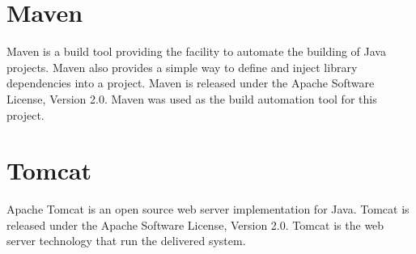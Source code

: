 \section{Maven}
Maven is a build tool providing the facility to automate the building of Java projects. Maven also provides a simple way to define and inject library dependencies into a project. Maven is released under the Apache Software License, Version 2.0. Maven was used as the build automation tool for this project.
\section{Tomcat}
Apache Tomcat is an open source web server implementation for Java. Tomcat is released under the Apache Software License, Version 2.0. Tomcat is the web server technology that run the delivered system.
